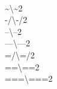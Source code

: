 {    {\\\~}{{\textcolor{vertexDarkRed}{\textbackslash\textasciitilde}}}{2}
    {\\-/}{{\textcolor{vertexDarkRed}{\textbackslash-/}}}{2}
    {\\--}{{\textcolor{vertexDarkRed}{\textbackslash--}}}{2}
    {\\---}{{\textcolor{vertexDarkRed}{\textbackslash---}}}{2}
    {\\=/}{{\textcolor{vertexDarkRed}{\textbackslash=/}}}{2}
    {\\==}{{\textcolor{vertexDarkRed}{\textbackslash==}}}{2}
    {\\===}{{\textcolor{vertexDarkRed}{\textbackslash===}}}{2}
}

\makeatletter
{}
    {\ifx\lst@literate\@empty\else
         \expandafter\lst@Literate\lst@literate{}\relax\z@
     \fi}
\makeatother
